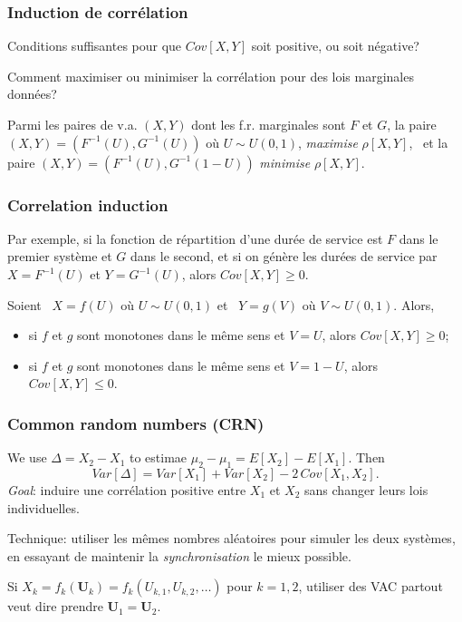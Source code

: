 \documentclass[t,usepdftitle=false]{beamer}
\def\bU{\boldsymbol{U}}
\begin{document}
\begin{frame}
	\frametitle{Induction de corrélation}
	
	Conditions suffisantes pour que $Cov[X,Y]$ 
	soit positive, ou soit négative?
	
	\mbox{}
	
	Comment maximiser ou minimiser la corrélation pour des lois 
	marginales données?
	
	\mbox{}
	
	\begin{theorem}
		Parmi les paires de v.a.{} $(X,Y)$ dont les f.r.{} marginales sont 
		${F}$ et ${G}$, la paire $(X,Y) = (F^{-1}(U), G^{-1}(U))$ 
		o\`u ${U} \sim U(0,1)$, 
		\emph{maximise} $\rho[X, Y]$, \
		et la paire $(X,Y) = (F^{-1}(U), G^{-1}(1-U))$
		\emph{minimise} $\rho[X, Y]$.
	\end{theorem}
	
\end{frame}

\begin{frame}
	\frametitle{Correlation induction}
	
	Par exemple, si la fonction de répartition d'une durée de service est 
	${F}$ dans le premier système et ${G}$ dans le second,
	et si on génère les durées de service par
	$X = F^{-1}(U)$ et $Y = G^{-1}(U)$, alors $Cov[X, Y] \ge 0$.
	
	\begin{theorem}
		Soient \ ${X} = {f}(U)$ o\`u ${U} \sim U(0,1)$ et \
		${Y} = {g}(V)$ o\`u ${V} \sim U(0,1)$. Alors,
		\begin{itemize}
			\item
			si $f$ et $g$ sont monotones dans le m\^eme sens et $V=U$,
			alors $Cov[X, Y] \ge 0$;
			\item
			si $f$ et $g$ sont monotones dans le m\^eme sens et $V=1-U$,
			alors $Cov[X, Y] \le 0$.
		\end{itemize}
	\end{theorem}
	
\end{frame}

\begin{frame}
	\frametitle{Common random numbers (CRN)}
	
	We use ${\Delta} = {X_2}-{X_1}$ to estimae ${\mu_2}-{\mu_1} = E[X_2] - E[X_1]$.
	Then
	\[
	Var[\Delta] = Var[X_1] + Var[X_2] - 2 \, Cov[X_1,X_2].
	\]
	\emph{Goal}: induire une corrélation positive entre $X_1$ et $X_2$
	sans changer leurs lois individuelles.
	
	\mbox{}
	
	Technique: utiliser les m\^emes nombres aléatoires pour simuler
	les deux systèmes, en essayant de maintenir la \emph{synchronisation}
	le mieux possible.
	
	\mbox{}
	
	Si $X_k = {f_k}(\bU_k) = f_k({U_{k,1}},{U_{k,2}},\dots)$ 
	pour $k=1,2$, utiliser des VAC partout veut dire prendre $\bU_1=\bU_2$.
	
\end{frame}
\end{document}
